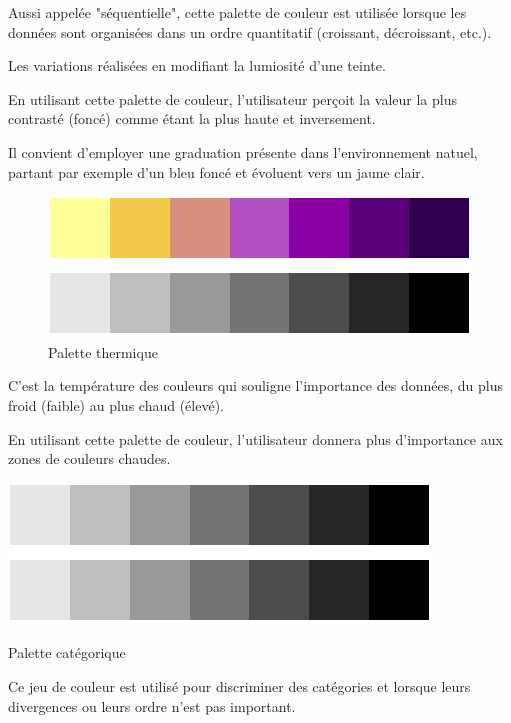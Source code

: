 \documentclass[a4paper,12pt]{article}
\begin{document}
\begin{multicols}{2}
Aussi appelée "séquentielle", cette palette de couleur est utilisée lorsque les données sont organisées dans un ordre quantitatif (croissant, décroissant, etc.). \autocite{wilkeColorScales2019,jonathanschwabishDevelopingDataVisualization2021} 

Les variations réalisées en modifiant la lumiosité d'une teinte.\autocite{andreaskrauseBestPracticesData2024} 

En utilisant cette palette de couleur, l'utilisateur perçoit la valeur la plus contrasté (foncé) comme étant la plus haute et inversement. \autocite{REF???}

Il convient d'employer une graduation présente dans l'environnement natuel, partant par exemple d'un bleu foncé et évoluent vers un jaune clair. \autocite{wilkeColorScales2019}

\begin{figure}[H]
\centering
\includegraphics[width=.9\linewidth]{./img/palette-thermique.pdf}
\caption{\label{fig:org2227930}Palette thermique}
\end{figure}

C'est la température des couleurs qui souligne l'importance des données, du plus froid (faible) au plus chaud (élevé). \autocite{REF???}

En utilisant cette palette de couleur, l'utilisateur donnera plus d'importance aux zones de couleurs chaudes. \autocite{REF???}

\begin{center}
\includegraphics[width=.9\linewidth]{./img/palette-categorique.pdf}
\caption{\label{fig:orge7bb25a}Palette catégorique}
\end{center}
Ce jeu de couleur est utilisé pour discriminer des catégories et lorsque leurs divergences ou leurs ordre n'est pas important.\autocite{andreaskrauseBestPracticesData2024}


\end{multicols}
\end{document}
